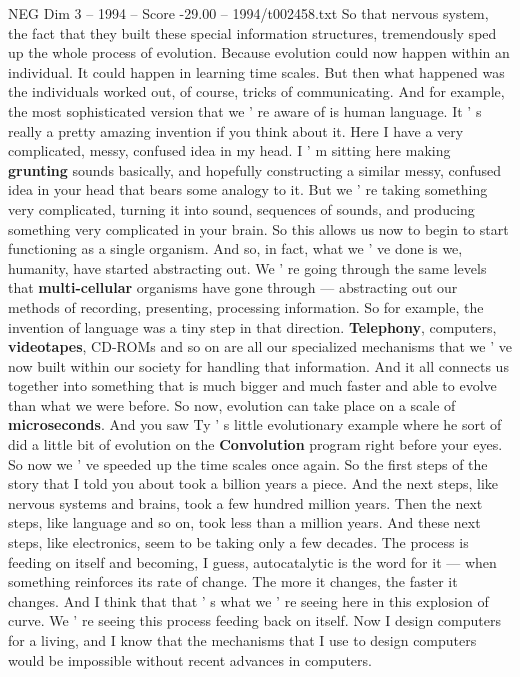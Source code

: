 \begin{textsample}{NEG Dim 3 – 1994 – Score -29.00 – 1994/t002458.txt}
So that nervous system, the fact that they built these special information structures, tremendously sped up the whole process of evolution.
Because evolution could now happen within an individual.
It could happen in learning time scales.
But then what happened was the individuals worked out, of course, tricks of communicating.
And for example, the most sophisticated version that we ' re aware of is human language.
It ' s really a pretty amazing invention if you think about it.
Here I have a very complicated, messy, confused idea in my head.
I ' m sitting here making \textbf{grunting} sounds basically, and hopefully constructing a similar messy, confused idea in your head that bears some analogy to it.
But we ' re taking something very complicated, turning it into sound, sequences of sounds, and producing something very complicated in your brain.
So this allows us now to begin to start functioning as a single organism.
And so, in fact, what we ' ve done is we, humanity, have started abstracting out.
We ' re going through the same levels that \textbf{multi-cellular} organisms have gone through — abstracting out our methods of recording, presenting, processing information.
So for example, the invention of language was a tiny step in that direction. \textbf{Telephony}, computers, \textbf{videotapes}, CD-ROMs and so on are all our specialized mechanisms that we ' ve now built within our society for handling that information.
And it all connects us together into something that is much bigger and much faster and able to evolve than what we were before.
So now, evolution can take place on a scale of \textbf{microseconds}.
And you saw Ty ' s little evolutionary example where he sort of did a little bit of evolution on the \textbf{Convolution} program right before your eyes.
So now we ' ve speeded up the time scales once again.
So the first steps of the story that I told you about took a billion years a piece.
And the next steps, like nervous systems and brains, took a few hundred million years.
Then the next steps, like language and so on, took less than a million years.
And these next steps, like electronics, seem to be taking only a few decades.
The process is feeding on itself and becoming, I guess, autocatalytic is the word for it — when something reinforces its rate of change.
The more it changes, the faster it changes.
And I think that that ' s what we ' re seeing here in this explosion of curve.
We ' re seeing this process feeding back on itself.
Now I design computers for a living, and I know that the mechanisms that I use to design computers would be impossible without recent advances in computers.

\end{textsample}
